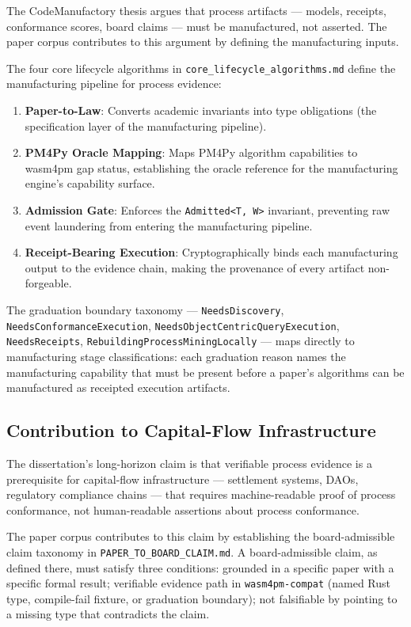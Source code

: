 The CodeManufactory thesis argues that process artifacts --- models, receipts,
conformance scores, board claims --- must be manufactured, not asserted. The
paper corpus contributes to this argument by defining the manufacturing inputs.

The four core lifecycle algorithms in \texttt{core\_lifecycle\_algorithms.md}
define the manufacturing pipeline for process evidence:

\begin{enumerate}
  \item \textbf{Paper-to-Law}: Converts academic invariants into type
    obligations (the specification layer of the manufacturing pipeline).
  \item \textbf{PM4Py Oracle Mapping}: Maps PM4Py algorithm capabilities to
    wasm4pm gap status, establishing the oracle reference for the manufacturing
    engine's capability surface.
  \item \textbf{Admission Gate}: Enforces the \texttt{Admitted<T, W>}
    invariant, preventing raw event laundering from entering the manufacturing
    pipeline.
  \item \textbf{Receipt-Bearing Execution}: Cryptographically binds each
    manufacturing output to the evidence chain, making the provenance of every
    artifact non-forgeable.
\end{enumerate}

The graduation boundary taxonomy --- \texttt{NeedsDiscovery},
\texttt{NeedsConformanceExecution}, \texttt{NeedsObjectCentricQueryExecution},
\texttt{NeedsReceipts}, \texttt{RebuildingProcessMiningLocally} --- maps
directly to manufacturing stage classifications: each graduation reason names
the manufacturing capability that must be present before a paper's algorithms
can be manufactured as receipted execution artifacts.

\subsection{Contribution to Capital-Flow Infrastructure}
\label{sec:sources-papers-contribution-capital}

The dissertation's long-horizon claim is that verifiable process evidence is a
prerequisite for capital-flow infrastructure --- settlement systems, DAOs,
regulatory compliance chains --- that requires machine-readable proof of
process conformance, not human-readable assertions about process conformance.

The paper corpus contributes to this claim by establishing the board-admissible
claim taxonomy in \texttt{PAPER\_TO\_BOARD\_CLAIM.md}. A board-admissible
claim, as defined there, must satisfy three conditions: grounded in a specific
paper with a specific formal result; verifiable evidence path in
\texttt{wasm4pm-compat} (named Rust type, compile-fail fixture, or graduation
boundary); not falsifiable by pointing to a missing type that contradicts the
claim.

